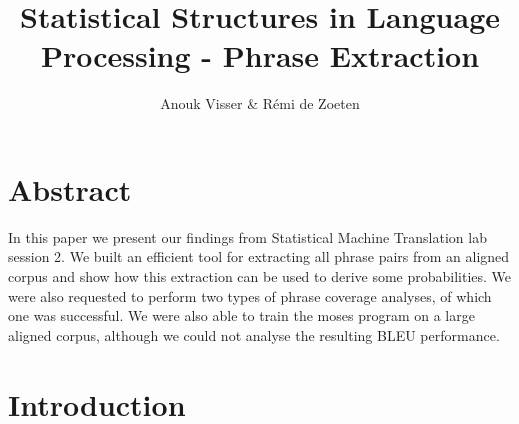 \documentclass[11pt]{article}
\title{Statistical Structures in Language Processing - Phrase Extraction}
\author{Anouk Visser \& R\'emi de Zoeten}
\date{}
\begin{document}
\maketitle
\newpage
\tableofcontents
\newpage

\section{Abstract}
In this paper we present our findings from Statistical Machine Translation lab session 2. We built an efficient tool for extracting all phrase pairs from an aligned corpus and show how this extraction can be used to derive some probabilities. We were also requested to perform two types of phrase coverage analyses, of which one was successful. We were also able to train the moses program on a large aligned corpus, although we could not analyse the resulting BLEU performance.

\section{Introduction}
\end{document}

